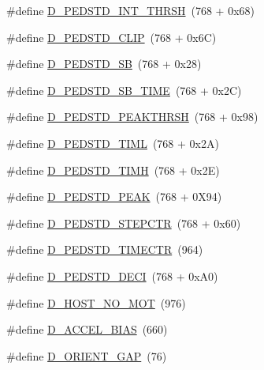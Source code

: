 \begin{DoxyCompactItemize}
\item 
\#define \hyperlink{group___d_r_i_v_e_r_s_ga35d9c5ca325de3055539cdae8e5b497c}{D\+\_\+\+P\+E\+D\+S\+T\+D\+\_\+\+I\+N\+T\+\_\+\+T\+H\+R\+SH}~(768 + 0x68)
\item 
\#define \hyperlink{group___d_r_i_v_e_r_s_ga211abccbe885d02059206ca4da711b54}{D\+\_\+\+P\+E\+D\+S\+T\+D\+\_\+\+C\+L\+IP}~(768 + 0x6\+C)
\item 
\#define \hyperlink{group___d_r_i_v_e_r_s_ga50a1a44c925cadaa77b3b88e08db7e08}{D\+\_\+\+P\+E\+D\+S\+T\+D\+\_\+\+SB}~(768 + 0x28)
\item 
\#define \hyperlink{group___d_r_i_v_e_r_s_ga0d3790675bcf0bbb837f2834523aca11}{D\+\_\+\+P\+E\+D\+S\+T\+D\+\_\+\+S\+B\+\_\+\+T\+I\+ME}~(768 + 0x2\+C)
\item 
\#define \hyperlink{group___d_r_i_v_e_r_s_ga3b281a8de65d0ac3ed6321b4df4ab6d0}{D\+\_\+\+P\+E\+D\+S\+T\+D\+\_\+\+P\+E\+A\+K\+T\+H\+R\+SH}~(768 + 0x98)
\item 
\#define \hyperlink{group___d_r_i_v_e_r_s_ga1968b4f2f2daece7e19a24bad6388864}{D\+\_\+\+P\+E\+D\+S\+T\+D\+\_\+\+T\+I\+ML}~(768 + 0x2\+A)
\item 
\#define \hyperlink{group___d_r_i_v_e_r_s_ga3c410f5ee95cf78486e71a276ed8b36a}{D\+\_\+\+P\+E\+D\+S\+T\+D\+\_\+\+T\+I\+MH}~(768 + 0x2\+E)
\item 
\#define \hyperlink{group___d_r_i_v_e_r_s_ga1e71c4f2fc11aa787bd4c8a5a4126525}{D\+\_\+\+P\+E\+D\+S\+T\+D\+\_\+\+P\+E\+AK}~(768 + 0\+X94)
\item 
\#define \hyperlink{group___d_r_i_v_e_r_s_ga4925c8f2bfe6e2698c10bf5b1094dc54}{D\+\_\+\+P\+E\+D\+S\+T\+D\+\_\+\+S\+T\+E\+P\+C\+TR}~(768 + 0x60)
\item 
\#define \hyperlink{group___d_r_i_v_e_r_s_gaee461dfb8a3fcd18ea6dddeaba63457b}{D\+\_\+\+P\+E\+D\+S\+T\+D\+\_\+\+T\+I\+M\+E\+C\+TR}~(964)
\item 
\#define \hyperlink{group___d_r_i_v_e_r_s_gae84f6c1fd0f4ccc0f0b5aedc01d48636}{D\+\_\+\+P\+E\+D\+S\+T\+D\+\_\+\+D\+E\+CI}~(768 + 0x\+A0)
\item 
\#define \hyperlink{group___d_r_i_v_e_r_s_ga0ee24f50eee31a512b652647521d24bb}{D\+\_\+\+H\+O\+S\+T\+\_\+\+N\+O\+\_\+\+M\+OT}~(976)
\item 
\#define \hyperlink{group___d_r_i_v_e_r_s_ga2cc522b8f621f32418257ab61144a744}{D\+\_\+\+A\+C\+C\+E\+L\+\_\+\+B\+I\+AS}~(660)
\item 
\#define \hyperlink{group___d_r_i_v_e_r_s_gac74c2352245609d469f38d6ffff9030e}{D\+\_\+\+O\+R\+I\+E\+N\+T\+\_\+\+G\+AP}~(76)
\item 

\end{DoxyCompactItemize}
